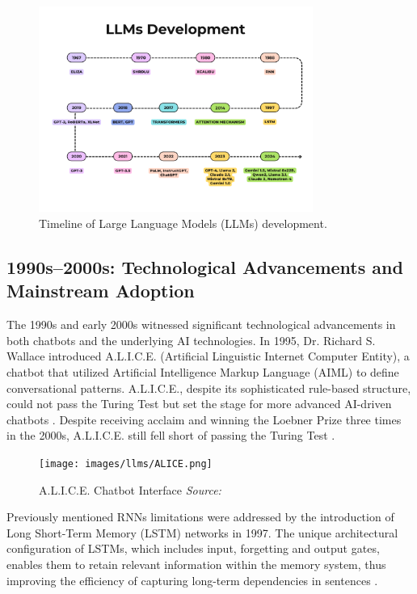 \begin{figure}[h!]
    \centering
    \includegraphics[width=0.8\textwidth]{images/llms/llms-timeline.png}
    \caption{Timeline of Large Language Models (LLMs) development.}
    \label{fig:llms-history}
\end{figure}

\subsection{1990s–2000s: Technological Advancements and Mainstream Adoption}

The 1990s and early 2000s witnessed significant technological advancements in both chatbots and the underlying AI technologies. In 1995, Dr. Richard S. Wallace introduced A.L.I.C.E. (Artificial Linguistic Internet Computer Entity), a chatbot that utilized Artificial Intelligence Markup Language (AIML) to define conversational patterns. A.L.I.C.E., despite its sophisticated rule-based structure, could not pass the Turing Test but set the stage for more advanced AI-driven chatbots \cite{wallace2009anatomy}. Despite receiving acclaim and winning the Loebner Prize three times in the 2000s, A.L.I.C.E. still fell short of passing the Turing Test \cite{shum2018eliza}. 

\begin{figure}[h!]
    \centering
    \texttt{[image: images/llms/ALICE.png]}
    \caption{A.L.I.C.E. Chatbot Interface \textit{Source:} \cite{escudeiro2008}}
    \label{fig:alice_chatbot}
\end{figure}

Previously mentioned RNNs limitations were addressed by the introduction of Long Short-Term Memory (LSTM) networks in 1997. The unique architectural configuration of LSTMs, which includes input, forgetting and output gates, enables them to retain relevant information within the memory system, thus improving the efficiency of capturing long-term dependencies in sentences \cite{hochreiter1997long}.

